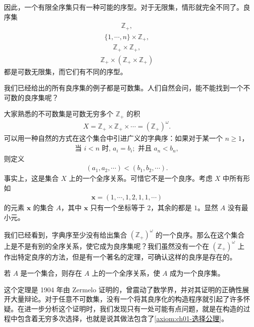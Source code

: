 \documentclass[../../main.tex]{subfiles}
\begin{document}
因此，一个有限全序集只有一种可能的序型。对于无限集，情形就完全不同了。良序集
\begin{align*}
\mathbb{Z}_{+},
\end{align*}
\begin{align*}
\{1, \cdots, n\} \times \mathbb{Z}_{+},
\end{align*}
\begin{align*}
\mathbb{Z}_{+} \times \mathbb{Z}_{+},
\end{align*}
\begin{align*}
\mathbb{Z}_{+} \times (\mathbb{Z}_{+} \times \mathbb{Z}_{+})
\end{align*}
都是可数无限集，而它们有不同的序型。

我们已经给出的所有良序集的例子都是可数集。人们自然会问，能不能找到一个不可数的良序集呢？

大家熟悉的不可数集是可数无穷多个 $\mathbb{Z}_{+}$ 的积
\begin{align*}
X = \mathbb{Z}_{+} \times \mathbb{Z}_{+} \times \cdots = (\mathbb{Z}_{+})^{\omega}.
\end{align*}
可以用一种自然的方式在这个集合中引进广义的字典序：如果对于某一个 $n \geqslant 1$，
\begin{align*}
\text{当 } i < n \text{ 时, } a_{i} = b_{i}; \text{ 并且 } a_{n} < b_{n},
\end{align*}
则定义
\begin{align*}
(a_{1}, a_{2}, \cdots) < (b_{1}, b_{2}, \cdots).
\end{align*}
事实上，这是集合 $X$ 上的一个全序关系。可惜它不是一个良序。考虑 $X$ 中所有形如
\begin{align*}
\boldsymbol{x} = (1, \cdots, 1, 2, 1, 1, \cdots)
\end{align*}
的元素 $\boldsymbol{x}$ 的集合 $A$，其中 $\boldsymbol{x}$ 只有一个坐标等于 $2$，其余的都是 $1$。显然 $A$ 没有最小元。

我们已经看到，字典序至少没有给出集合 $(\mathbb{Z}_{+})^{\omega}$ 的一个良序。那么在这个集合上是不是有别的全序关系，使它成为良序集呢？我们虽然没有一个在 $(\mathbb{Z}_{+})^{\omega}$ 上作出特定良序的方法，但是有一个著名的定理，可确认这样的良序是存在的。

\begin{theorem}[良序定理]\label{theorem:ch01-良序性质定理}
若 $A$ 是一个集合，则存在 $A$ 上的一个全序关系，使 $A$ 成为一个良序集。
\end{theorem}

这个定理是 1904 年由 Zermelo 证明的，曾震动了数学界，并对其证明的正确性展开大量辩论。对于任意不可数集，没有一个将其良序化的构造程序就引起了许多怀疑。在进一步分析这个证明时，我们发现只有一处可能有点问题，就是在构造的过程中包含着无穷多次选择，也就是说其做法包含了\cref{axiom:ch01-选择公理}。
\end{document}
